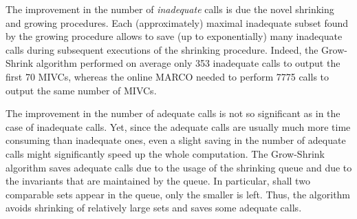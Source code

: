 The improvement in the number of \emph{inadequate} calls is due the novel shrinking and growing procedures. 
Each (approximately) maximal inadequate subset found by the growing procedure allows to save (up to exponentially) many inadequate calls during subsequent executions of the shrinking procedure.
Indeed, the Grow-Shrink algorithm performed on average only 353 inadequate calls to output the first 70 MIVCs, whereas the online MARCO needed to perform 7775 calls to output the same number of MIVCs. 

The improvement in the number of adequate calls is not so significant as in the case of inadequate calls. Yet, since the adequate calls are usually much more time consuming than inadequate ones, even a slight saving in the number of adequate calls might significantly speed up the whole computation. The Grow-Shrink algorithm saves adequate calls due to the usage of the shrinking queue and due to the invariants that are maintained by the queue. In particular, shall two comparable sets appear in the queue, only the smaller is left. Thus, the algorithm avoids shrinking of relatively large sets and saves some adequate calls.
